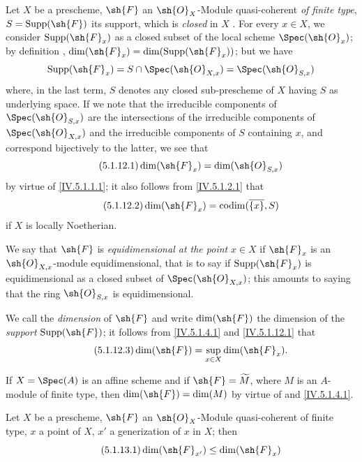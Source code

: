 \begin{env}[5.1.12]
\label{IV.5.1.12}
Let $X$ be a prescheme, $\sh{F}$ an $\sh{O}_X$-Module quasi-coherent \emph{of finite type}, $S=\operatorname{Supp}(\sh{F})$ its support, which is \emph{closed} in $X$ .
For every $x\in X$, we consider $\operatorname{Supp}(\sh{F}_x)$ as a closed subset of the local scheme $\Spec(\sh{O}_x)$; by definition , $\dim(\sh{F}_x)=\dim(\operatorname{Supp}(\sh{F}_x))$; but we have
\[
  \operatorname{Supp}(\sh{F}_x) = S\cap\Spec(\sh{O}_{X,x}) = \Spec(\sh{O}_{S,x})
\]
where, in the last term, $S$ denotes any closed sub-prescheme of $X$ having $S$ as underlying space.
If we note that the irreducible components of $\Spec(\sh{O}_{S,x})$ are the intersections of the irreducible components of $\Spec(\sh{O}_{X,x})$ and the irreducible components of $S$ containing $x$, and correspond bijectively to the latter, we see that
\[
\tag{5.1.12.1}\label{IV.5.1.12.1}
  \dim(\sh{F}_x) = \dim(\sh{O}_{S,x})
\]
by virtue of \eqref{IV.5.1.1.1}; it also follows from \eqref{IV.5.1.2.1} that
\[
\tag{5.1.12.2}\label{IV.5.1.12.2}
  \dim(\sh{F}_x) = \operatorname{codim}(\overline{\{x\}}, S)
\]
if $X$ is locally Noetherian.

We say that $\sh{F}$ is \emph{equidimensional at the point} $x\in X$ if $\sh{F}_x$ is an $\sh{O}_{X,x}$-module equidimensional, that is to say  if $\operatorname{Supp}(\sh{F}_x)$ is equidimensional as a closed subset of $\Spec(\sh{O}_{X,x})$; this amounts to saying that the ring $\sh{O}_{S,x}$ is equidimensional.

We call the \emph{dimension} of $\sh{F}$ and write $\dim(\sh{F})$ the dimension of the \emph{support} $\operatorname{Supp}(\sh{F})$; it follows from \eqref{IV.5.1.4.1} and \eqref{IV.5.1.12.1} that
\[
\tag{5.1.12.3}\label{IV.5.1.12.3}
  \dim(\sh{F}) = \sup_{x\in X} \dim(\sh{F}_x).
\]

If $X=\Spec(A)$ is an affine scheme and if $\sh{F}=\widetilde{M}$, where $M$ is an $A$-module of finite type, then $\dim(\sh{F})=\dim(M)$ by virtue of  and \eqref{IV.5.1.4.1}.
\end{env}

\begin{proposition}[5.1.13]
\label{IV.5.1.13}
Let $X$ be a prescheme, $\sh{F}$ an $\sh{O}_X$-Module quasi-coherent of finite type, $x$ a point of $X$, $x'$ a generization of $x$ in $X$; then
\[
\tag{5.1.13.1}\label{IV.5.1.13.1}
  \dim(\sh{F}_{x'}) \leq \dim(\sh{F}_x)
\]
\end{proposition}

